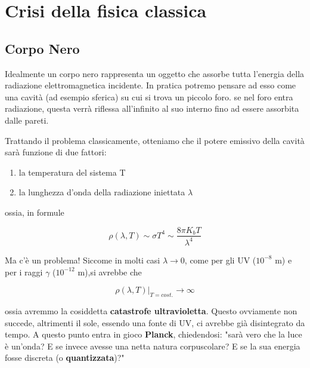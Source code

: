 

\chapter{Crisi della fisica classica}

\section{Corpo Nero}
	Idealmente un corpo nero rappresenta un oggetto che assorbe tutta l'energia della radiazione elettromagnetica incidente. \newline
In pratica potremo pensare ad esso come una cavit\`a (ad esempio sferica) su cui si trova un piccolo foro. se nel foro entra radiazione, questa verr\`a riflessa all'infinito al suo interno fino ad essere assorbita dalle pareti.

Trattando il problema classicamente, otteniamo che il potere emissivo della cavità sar\`a funzione di due fattori:

\begin{enumerate}
	\item la temperatura del sistema T
	\item la lunghezza d'onda della radiazione iniettata $\lambda $
\end{enumerate}	

ossia, in formule

\begin{equation}
\rho( \lambda, T) \sim \sigma T^4 \sim \frac{8\pi K_b T}{\lambda^4}
\end{equation}

Ma c'\`e un problema! Siccome in molti casi  $\lambda \to 0$, come per gli UV \newline ($10^{-8}$ m) e per i raggi $\gamma$ ($10^{-12}$ m),si avrebbe che 

\begin{equation}
\rho( \lambda, T)|_{T= cost.} \to \infty
\end{equation}

ossia avremmo la cosiddetta \textbf{catastrofe ultravioletta}.\newline
Questo ovviamente non succede, altrimenti il sole, essendo una fonte di UV, ci avrebbe gi\`a disintegrato da tempo.\newline
\newline
\newline
\noindent A questo punto entra in gioco \textbf{Planck}, chiedendosi: "sar\`a vero che la luce \`e un'onda? E se invece avesse una netta natura corpuscolare? E se la sua energia fosse discreta (o \textbf{quantizzata})?"

